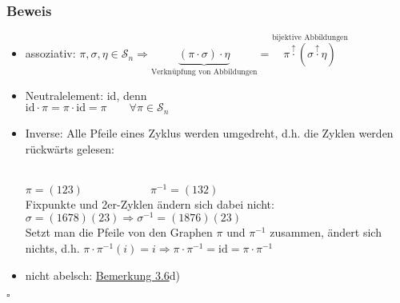 \documentclass[a4paper, 12pt,titlepage, pdf, headsepline]{article}
\newcommand{\id}{\textrm{id}}
\newcommand{\qed}{\hfill$\square$}
\renewcommand{\>}{\rightarrow}
\renewcommand{\*}{\cdot}
\begin{document}
	      \subsubsection*{Beweis}
	      \begin{itemize}
	      	\item assoziativ: $\pi, \sigma, \eta \in \mathscr{S}_n \Rightarrow \underbrace{(\pi \cdot \sigma) \cdot \eta}_{\textrm{Verknüpfung von Abbildungen}} = \overset{\textrm{bijektive Abbildungen}}{\pi \overset{\uparrow}{\cdot} (\sigma \overset{\uparrow}{\cdot} \eta)}$
	      	\item Neutralelement: id, denn \\
	      	      $\id \cdot \pi = \pi \cdot \id = \pi\qquad\forall\pi\in\mathscr{S}_n$
	      	\item Inverse: Alle Pfeile eines Zyklus werden umgedreht, d.h. die Zyklen werden rückwärts gelesen:\\
	      	      \\
	      	      $\pi=(123)\qquad\qquad\qquad\pi^{-1}=(132)$\\
	      	      Fixpunkte und 2er-Zyklen ändern sich dabei nicht:\\
	      	      $\sigma = (1678)(23)\Rightarrow\sigma^{-1} = (1876)(23)$\\
	      	      Setzt man die Pfeile von den Graphen $\pi$ und $\pi^{-1}$ zusammen, ändert sich nichts, d.h. $\pi \cdot  \pi^{-1}(i) = i \Rightarrow \pi \cdot  \pi^{-1} = \id = \pi \cdot  \pi^{-1}$
	      	\item nicht abelsch: \hyperref[3.6]{Bemerkung 3.6}d)
	      \end{itemize}\qed\newpage
\end{document}
